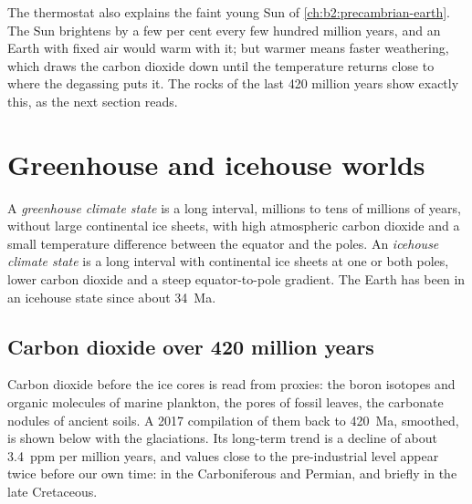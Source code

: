 The thermostat also explains the faint young Sun of \cref{ch:b2:precambrian-earth}. The Sun brightens
by a few per cent every few hundred million years, and an Earth with fixed air would warm with it;
but warmer means faster weathering, which draws the carbon dioxide down until the temperature
returns close to where the degassing puts it. The rocks of the last 420 million years show exactly
this, as the next section reads.

\section{Greenhouse and icehouse worlds}\label{sec:b2:deep-time-climate:states}

\begin{definition}\label{def:b2:deep-time-climate:states}
A \emph{greenhouse climate state} is a long interval, millions to
tens of millions of years, without large continental ice sheets, with high atmospheric carbon
dioxide and a small temperature difference between the equator and the poles. An \emph{icehouse
climate state} is a long interval with continental ice sheets at one
or both poles, lower carbon dioxide and a steep equator-to-pole gradient. The Earth has been in an
icehouse state since about \qty{34}{Ma}.
\end{definition}

\subsection*{Carbon dioxide over 420 million years}

Carbon dioxide before the ice cores is read from proxies: the boron isotopes and organic molecules
of marine plankton, the pores of fossil leaves, the carbonate nodules of ancient soils. A 2017
compilation of them back to \qty{420}{Ma}, smoothed, is shown below with the glaciations. Its
long-term trend is a decline of about \qty{3.4}{ppm} per million years, and values close to the
pre-industrial level appear twice before our own time: in the Carboniferous and Permian, and
briefly in the late Cretaceous.

